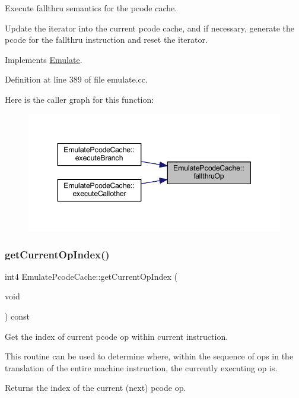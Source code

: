 Execute fallthru semantics for the pcode cache. 

Update the iterator into the current pcode cache, and if necessary, generate the pcode for the fallthru instruction and reset the iterator. 

Implements \mbox{\hyperlink{class_emulate_ae9cd5b56525c54479e9c7add4a17687b}{Emulate}}.



Definition at line 389 of file emulate.\+cc.

Here is the caller graph for this function\+:
\nopagebreak
\begin{figure}[H]
\begin{center}
\leavevmode
\includegraphics[width=344pt]{class_emulate_pcode_cache_a57be50a3c9751a6bcb40bf8c080f7774_icgraph}
\end{center}
\end{figure}
\mbox{\label{class_emulate_pcode_cache_a733683ca5bfdae3d607cf10c8db341e6}} 
\subsubsection{\texorpdfstring{getCurrentOpIndex()}{getCurrentOpIndex()}}
{\footnotesize\ttfamily int4 Emulate\+Pcode\+Cache\+::get\+Current\+Op\+Index (\begin{DoxyParamCaption}\item[{void}]{ }\end{DoxyParamCaption}) const\hspace{0.3cm}{\ttfamily [inline]}}



Get the index of current pcode op within current instruction. 

This routine can be used to determine where, within the sequence of ops in the translation of the entire machine instruction, the currently executing op is. \begin{DoxyReturn}{Returns}
the index of the current (next) pcode op. 
\end{DoxyReturn}


